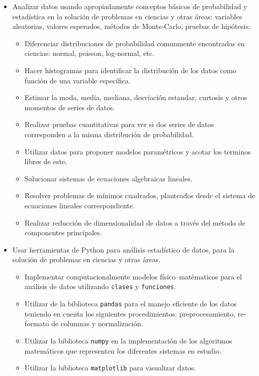 \documentclass[letterpaper,10pt,onecolumn]{article}
\begin{document}
\begin{itemize}
\item Analizar datos usando apropiadamente conceptos
  b\'asicos de probabilidad y estad\'istica en la soluci\'on de
  problemas en ciencias y otras \'areas: variables aleatorias, valores
  esperados, m\'etodos de Monte-Carlo, pruebas de hip\'otesis: 
 \begin{itemize}
  \item Diferenciar distribuciones de probabilidad comunmente
    encontradas en ciencias: normal, poisson, log-normal, etc. 
  \item Hacer histogramas para identificar la distribuci\'on de los
    datos como funci\'on de una variable espec\'ifica. 
  \item Estimar la moda, media, mediana, desviaci\'on estandar,
    curtosis y otros momentos de series de datos. 
  \item Realizar pruebas cuantitativas para ver si dos series de datos
    corresponden a la misma distribuci\'on de probabilidad. 
  \item Utilizar datos para proponer modelos param\'etricos y acotar
    los terminos libres de este.  
  \item Solucionar sistemas de ecuaciones algebraicas lineales.  
  \item Resolver problemas de m\'inimos cuadrados, planteados desde el
    sistema de ecuaciones lineales correspondiente. 
  \item Realizar reducci\'on de dimensionalidad de datos a trav\'es
    del m\'etodo de componentes principales. 
 \end{itemize}
\item Usar herramientas de Python para an\'alisis estad\'istico de
  datos, para la soluci\'on de problemas en ciencias y otras
  \'areas.\\[-0.6cm] 
\begin{itemize}
   \item Implementar computacionalmente modelos f\'isico--mat\'ematicos
     para el an\'alisis de datos utilizando \texttt{clases} y
     \texttt{funciones}.\\[-0.5cm] 
    \item Utilizar de la biblioteca \texttt{pandas} para el manejo eficiente de los datos
    teniendo en cuenta los siguientes procedimientos: preprocesamiento, re-formato de
    columnas y normalizaci\'on.\\[-0.5cm] 
   \item Utilizar la biblioteca \texttt{numpy} en la implementaci\'on
     de los algoritmos matem\'aticos que representen los diferentes
     sistemas en estudio.\\[-0.5cm] 
    \item  Utilizar la biblioteca \texttt{matplotlib} para visualizar
      datos.\\[-0.5cm] 
\end{itemize}


\end{itemize}
\end{document}
